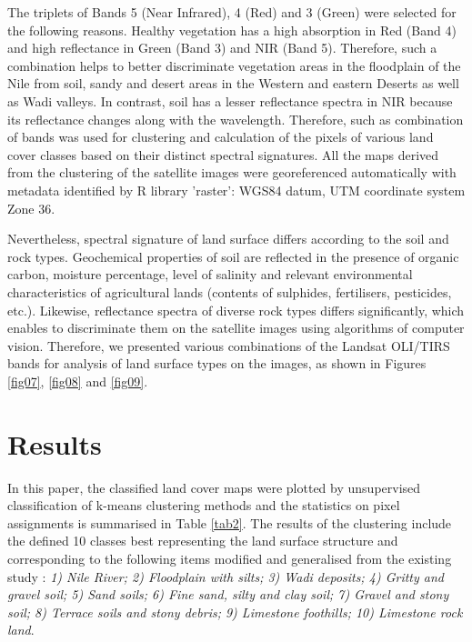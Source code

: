 \documentclass[information,article,submit,pdftex,moreauthors]{Definitions/mdpi}
\begin{document}
The triplets of Bands 5 (Near Infrared), 4 (Red) and 3 (Green) were selected for the following reasons. Healthy vegetation has a high absorption in Red (Band 4) and high reflectance in Green (Band 3) and NIR (Band 5). Therefore, such a combination helps to better discriminate vegetation areas in the floodplain of the Nile from soil, sandy and desert areas in the Western and eastern Deserts as well as Wadi valleys. In contrast, soil has a lesser reflectance spectra in NIR because its reflectance changes along with the wavelength. Therefore, such as combination of bands was used for clustering and calculation of the pixels of various land cover classes based on their distinct spectral signatures. All the maps derived from the clustering of the satellite images were georeferenced automatically with metadata identified by R library 'raster': WGS84 datum, UTM coordinate system Zone 36.

Nevertheless, spectral signature of land surface differs according to the soil and rock types. Geochemical properties of soil are reflected in the presence of organic carbon, moisture percentage, level of salinity and relevant environmental characteristics of agricultural lands (contents of sulphides, fertilisers, pesticides, etc.). Likewise, reflectance spectra of diverse rock types differs significantly, which enables to discriminate them on the satellite images using algorithms of computer vision. Therefore, we presented various combinations of the Landsat OLI/TIRS bands for analysis of land surface types on the images, as shown in Figures \ref{fig07}, \ref{fig08} and \ref{fig09}.

\section{Results}

In this paper, the classified land cover maps were plotted by unsupervised classification of k-means clustering methods and the statistics on pixel assignments is summarised in Table \ref{tab2}. The results of the clustering include the defined 10 classes best representing the land surface structure and corresponding to the following items modified and generalised from the existing study \cite{Kamel}: \emph{1) Nile River; 2) Floodplain with silts; 3) Wadi deposits; 4) Gritty and gravel soil;  5) Sand soils; 6) Fine sand, silty and clay soil; 7) Gravel and stony soil; 8) Terrace soils and stony debris; 9) Limestone foothills; 10) Limestone rock land}. 
\end{document}
